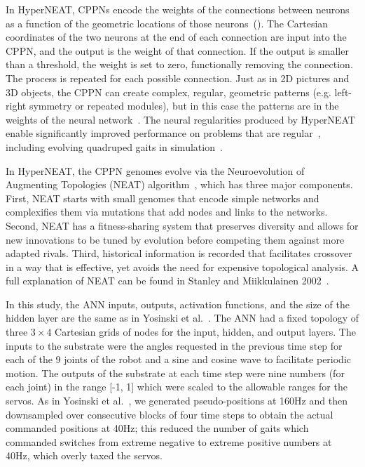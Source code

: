 In HyperNEAT, CPPNs encode the weights of the connections between neurons as a function of the geometric locations of those neurons~(). The Cartesian coordinates of the two neurons at the end of each connection are input into the CPPN, and the output is the weight of that connection. If the output is smaller than a threshold, the weight is set to zero, functionally removing the connection. The process is repeated for each possible connection. Just as in 2D pictures and 3D objects, the CPPN can create complex, regular, geometric patterns (e.g. left-right symmetry or repeated modules), but in this case the patterns are in the weights of the neural network~\cite{clune2011performance}. The neural regularities produced by HyperNEAT enable significantly improved performance on problems that are regular~\cite{clune2011performance,stanley2009hypercube}, including evolving quadruped gaits in simulation~\cite{clune2011performance,clune2009evolving,clune2009sensitivity}. 

In HyperNEAT, the CPPN genomes evolve via the Neuroevolution of Augmenting Topologies (NEAT) algorithm~\cite{stanley2002evolving}, which has three major components. 
First, NEAT starts with small genomes that encode simple networks and complexifies them via mutations that add nodes and links to the networks. Second, NEAT has a fitness-sharing system that preserves diversity and allows for new innovations to be tuned by evolution before competing them against more adapted rivals. 
Third, historical information is recorded that facilitates crossover in a way that is effective, yet avoids the need for expensive topological analysis. A full explanation of NEAT can be found in Stanley and Miikkulainen 2002~\cite{stanley2002evolving}. 

In this study, the ANN inputs, outputs, activation functions, and the size of the hidden layer are the same as in Yosinski et al.~\cite{yos:clune}. 
The ANN had a fixed topology of three \begin{math}3\times4\end{math} Cartesian grids of nodes for the input, hidden, and output layers. 
The inputs to the substrate were the angles requested in the previous time step for each of the 9 joints of the robot and a sine and cosine wave to facilitate periodic motion. 
The outputs of the substrate at each time step were nine numbers (for each joint) in the range [-1, 1] which were scaled to the allowable ranges for the servos. 
As in Yosinski et al.~\cite{yos:clune}, we generated pseudo-positions at 160Hz and then downsampled over consecutive blocks of four time steps to obtain the actual commanded positions at 40Hz; this reduced the number of gaits which commanded switches from extreme negative to extreme positive numbers at 40Hz, which overly taxed the servos.



